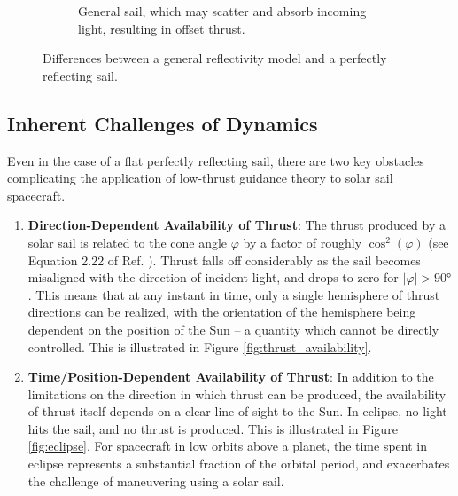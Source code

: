 \begin{figure}[H]
\begin{subfigure}[t]{0.49\textwidth}
    \caption{General sail, which may scatter and absorb incoming light, resulting in offset thrust.}
    \label{fig:general_sail}
    \end{subfigure}
    \caption{Differences between a general reflectivity model and a perfectly reflecting sail.}
    \label{fig:sail_reflectivity_comparison}
\end{figure}

\subsection{Inherent Challenges of Dynamics}
Even in the case of a flat perfectly reflecting sail, there are two key obstacles complicating the application of low-thrust guidance theory to solar sail spacecraft.
\begin{enumerate}
    \item \textbf{Direction-Dependent Availability of Thrust}: The thrust produced by a solar sail is related to the cone angle $\varphi$ by a factor of roughly $\cos^2(\varphi)$ (see Equation 2.22 of Ref. \cite{mcinnes}). Thrust falls off considerably as the sail becomes misaligned with the direction of incident light, and drops to zero for $|\varphi| > \ang{90}$. This means that at any instant in time, only a single hemisphere of thrust directions can be realized, with the orientation of the hemisphere being dependent on the position of the Sun -- a quantity which cannot be directly controlled. This is illustrated in Figure \ref{fig:thrust_availability}.
    \item \textbf{Time/Position-Dependent Availability of Thrust}: In addition to the limitations on the direction in which thrust can be produced, the availability of thrust itself depends on a clear line of sight to the Sun. In eclipse, no light hits the sail, and no thrust is produced. This is illustrated in Figure \ref{fig:eclipse}. For spacecraft in low orbits above a planet, the time spent in eclipse represents a substantial fraction of the orbital period, and exacerbates the challenge of maneuvering using a solar sail.
\end{enumerate}

